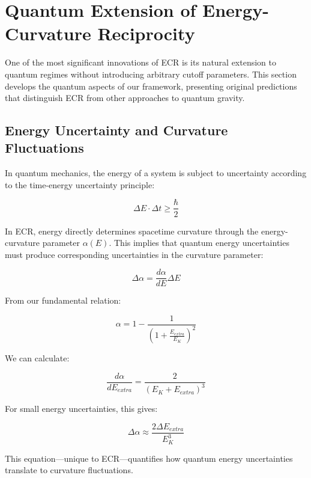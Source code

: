 \documentclass[11pt,a4paper]{article}
\begin{document}
\section{Quantum Extension of Energy-Curvature Reciprocity}\label{sec:quantum}

One of the most significant innovations of ECR is its natural extension to quantum regimes without introducing arbitrary cutoff parameters. This section develops the quantum aspects of our framework, presenting original predictions that distinguish ECR from other approaches to quantum gravity.

\subsection{Energy Uncertainty and Curvature Fluctuations}

In quantum mechanics, the energy of a system is subject to uncertainty according to the time-energy uncertainty principle:

\begin{equation}
    \Delta E \cdot \Delta t \geq \frac{\hbar}{2}
\end{equation}

In ECR, energy directly determines spacetime curvature through the energy-curvature parameter $\alpha(E)$. This implies that quantum energy uncertainties must produce corresponding uncertainties in the curvature parameter:

\begin{equation}
    \Delta\alpha = \frac{d\alpha}{dE}\Delta E
\end{equation}

From our fundamental relation:

\begin{equation}
    \alpha = 1 - \frac{1}{\left(1 + \frac{E_{extra}}{E_K}\right)^2}
\end{equation}

We can calculate:

\begin{equation}
    \frac{d\alpha}{dE_{extra}} = \frac{2}{\left(E_K + E_{extra}\right)^3}
\end{equation}

For small energy uncertainties, this gives:

\begin{equation}
    \Delta\alpha \approx \frac{2\Delta E_{extra}}{E_K^3}
\end{equation}

This equation—unique to ECR—quantifies how quantum energy uncertainties translate to curvature fluctuations.
\end{document}
